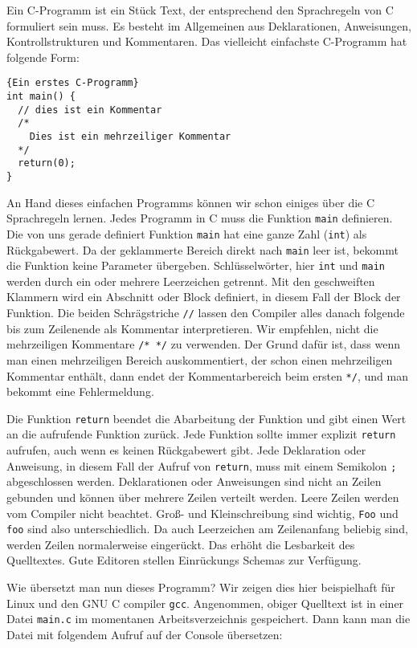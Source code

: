Ein C-Programm ist ein Stück Text, der entsprechend den Sprachregeln von C formuliert sein muss.
Es besteht im Allgemeinen aus Deklarationen, Anweisungen, Kontrollstrukturen und Kommentaren.
Das vielleicht einfachste C-Programm hat folgende Form:
\begin{lstlisting}{Ein erstes C-Programm}
int main() {
  // dies ist ein Kommentar
  /*
    Dies ist ein mehrzeiliger Kommentar
  */
  return(0);
}
\end{lstlisting}
An Hand dieses einfachen Programms können wir schon einiges über die C Sprachregeln lernen.
Jedes Programm in C muss die Funktion \texttt{main} definieren. 
Die von uns gerade definiert Funktion \texttt{main} hat eine ganze Zahl (\texttt{int}) als Rückgabewert.
Da der geklammerte Bereich direkt nach \texttt{main} leer ist, bekommt die Funktion keine Parameter übergeben.
Schlüsselwörter, hier \texttt{int} und \texttt{main} werden durch ein oder mehrere Leerzeichen getrennt.
Mit den geschweiften Klammern wird ein Abschnitt oder Block definiert, in diesem Fall der Block der Funktion.
Die beiden Schrägstriche \texttt{//} lassen den Compiler alles danach folgende bis zum Zeilenende als Kommentar interpretieren.
Wir empfehlen, nicht die mehrzeiligen Kommentare \texttt{/* */} zu verwenden.
Der Grund dafür ist, dass wenn man einen mehrzeiligen Bereich auskommentiert, der schon einen mehrzeiligen Kommentar enthält, dann endet der Kommentarbereich beim ersten \texttt{*/}, und man bekommt eine Fehlermeldung.

Die Funktion \texttt{return} beendet die Abarbeitung der Funktion und gibt einen Wert an die aufrufende Funktion zurück.
Jede Funktion sollte immer explizit \texttt{return} aufrufen, auch wenn es keinen Rückgabewert gibt.
Jede Deklaration oder Anweisung, in diesem Fall der Aufruf von \texttt{return}, muss mit einem Semikolon \texttt{;} abgeschlossen werden.
Deklarationen oder Anweisungen sind nicht an Zeilen gebunden und können über mehrere Zeilen verteilt werden. 
Leere Zeilen werden vom Compiler nicht beachtet.
Groß- und Kleinschreibung sind wichtig, \texttt{Foo} und \texttt{foo} sind also unterschiedlich.
Da auch Leerzeichen am Zeilenanfang beliebig sind, werden Zeilen normalerweise eingerückt.
Das erhöht die Lesbarkeit des Quelltextes.
Gute Editoren stellen Einrückungs Schemas zur Verfügung.

Wie übersetzt man nun dieses Programm?
Wir zeigen dies hier beispielhaft für Linux und den GNU C compiler \texttt{gcc}.
Angenommen, obiger Quelltext ist in einer Datei \texttt{main.c} im momentanen Arbeitsverzeichnis gespeichert.
Dann kann man die Datei mit folgendem Aufruf auf der Console übersetzen:

